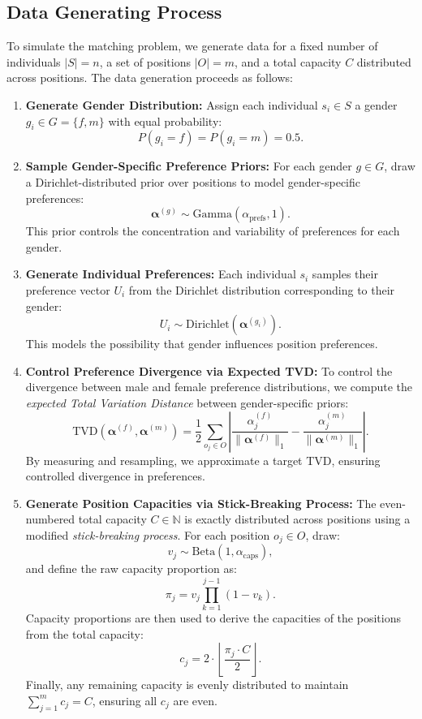 \documentclass[letterpaper]{article}
\begin{document}
\subsection*{Data Generating Process}

To simulate the matching problem, we generate data for a fixed number of individuals \( |S| = n \), a set of positions \( |O| = m \), and a total capacity \( C \) distributed across positions. The data generation proceeds as follows:

\begin{enumerate}
    \item \textbf{Generate Gender Distribution:}  
    Assign each individual \( s_i \in S \) a gender \( g_i \in G = \{f, m\} \) with equal probability:
    \[
    P(g_i = f) = P(g_i = m) = 0.5.
    \]

    \item \textbf{Sample Gender-Specific Preference Priors:}  
    For each gender \( g \in G \), draw a Dirichlet-distributed prior over positions to model gender-specific preferences:
    \[
    \boldsymbol{\alpha}^{(g)} \sim \text{Gamma}(\alpha_\text{prefs}, 1).
    \]
    This prior controls the concentration and variability of preferences for each gender.

    \item \textbf{Generate Individual Preferences:}  
    Each individual \( s_i \) samples their preference vector \( U_i \) from the Dirichlet distribution corresponding to their gender:
    \[
    U_i \sim \text{Dirichlet}(\boldsymbol{\alpha}^{(g_i)}).
    \]
    This models the possibility that gender influences position preferences.

    \item \textbf{Control Preference Divergence via Expected TVD:}  
    To control the divergence between male and female preference distributions, we compute the \textit{expected Total Variation Distance} between gender-specific priors:
    \[
    \text{TVD}(\boldsymbol{\alpha}^{(f)}, \boldsymbol{\alpha}^{(m)}) = \frac{1}{2} \sum_{o_j \in O} \left| \frac{\alpha^{(f)}_j}{{\|\boldsymbol{\alpha}^{(f)}\|_1}} - \frac{\alpha^{(m)}_j}{\|\boldsymbol{\alpha}^{(m)}\|_1} \right|.
    \]
    By measuring and resampling, we approximate a target TVD, ensuring controlled divergence in preferences.

    \item \textbf{Generate Position Capacities via Stick-Breaking Process:}  
    The even-numbered total capacity \( C \in \mathbb{N}\) is exactly distributed across positions using a modified \textit{stick-breaking process}. For each position \( o_j \in O \), draw:
    \[
    v_j \sim \text{Beta}(1, \alpha_\text{caps}),
    \]
    and define the raw capacity proportion as:
    \[
    \pi_j = v_j \prod_{k=1}^{j-1} (1 - v_k).
    \]
    Capacity proportions are then used to derive the capacities of the positions from the total capacity:
    \[
    c_j = 2 \cdot \left\lfloor \frac{\pi_j \cdot C}{2} \right\rfloor.
    \]
    Finally, any remaining capacity is evenly distributed to maintain \( \sum_{j=1}^m c_j = C \), ensuring all \( c_j \) are even.
\end{enumerate}
\end{document}
